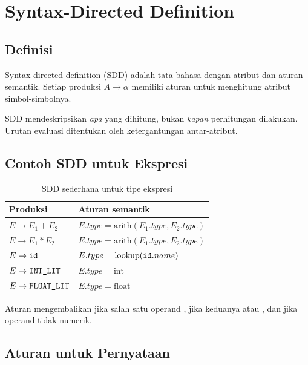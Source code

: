 \section{Syntax-Directed Definition}
\label{sec:ch14-sdd}

\subsection{Definisi}

\begin{definisi}[SDD]
Syntax-directed definition (SDD) adalah tata bahasa dengan atribut
dan aturan semantik. Setiap produksi \(A \to \alpha\) memiliki aturan
untuk menghitung atribut simbol-simbolnya.
\end{definisi}

SDD mendeskripsikan \emph{apa} yang dihitung, bukan \emph{kapan}
perhitungan dilakukan. Urutan evaluasi ditentukan oleh
ketergantungan antar-atribut.

\subsection{Contoh SDD untuk Ekspresi}

\begin{table}[H]
\centering
\caption{SDD sederhana untuk tipe ekspresi}
\label{tab:ch14-sdd}
\begin{tabularx}{\textwidth}{@{}l X@{}}
\toprule
\textbf{Produksi} & \textbf{Aturan semantik} \\
\midrule
\(E \to E_1 + E_2\) &
\(E.type = \text{arith}(E_1.type, E_2.type)\) \\
\(E \to E_1 * E_2\) &
\(E.type = \text{arith}(E_1.type, E_2.type)\) \\
\(E \to \texttt{id}\) &
\(E.type = \text{lookup}(\texttt{id}.name)\) \\
\(E \to \texttt{INT\_LIT}\) & \(E.type = \text{int}\) \\
\(E \to \texttt{FLOAT\_LIT}\) & \(E.type = \text{float}\) \\
\bottomrule
\end{tabularx}
\end{table}

Aturan  mengembalikan  jika salah satu
operand ,  jika keduanya  atau
, dan  jika operand tidak numerik.

\subsection{Aturan untuk Pernyataan}


